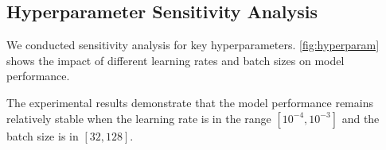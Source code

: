 \documentclass[macnew, en]{manuscript}
\begin{document}
\subsection{Hyperparameter Sensitivity Analysis}

We conducted sensitivity analysis for key hyperparameters. \cref{fig:hyperparam} shows the impact of different learning rates and batch sizes on model performance.


The experimental results demonstrate that the model performance remains relatively stable when the learning rate is in the range $[10^{-4}, 10^{-3}]$ and the batch size is in $[32, 128]$.

\printbibliography
\end{document}
